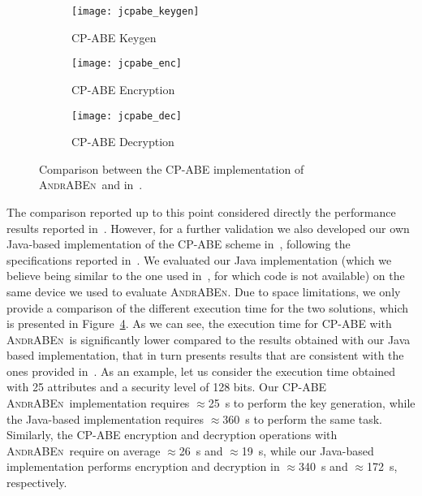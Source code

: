 \documentclass{sig-alternate-2013}
\newcommand{\andraben}{\textsc{AndrABEn}}
\begin{document}
\begin{figure}[h!]
	\centering
	\begin{subfigure}[b]{0.49\columnwidth}
		\centering
		\texttt{[image: jcpabe\_keygen]}
		\caption{CP-ABE Keygen}
		\label{cpabe_keygen_android_battery}
	\end{subfigure}
	\begin{subfigure}[b]{0.49\columnwidth}
		\centering
		\texttt{[image: jcpabe\_enc]}
		\caption{CP-ABE Encryption}
		\label{cpabe_enc_android}
	\end{subfigure}
\begin{subfigure}[b]{0.49\columnwidth}
		\centering
		\texttt{[image: jcpabe\_dec]}
		\caption{CP-ABE Decryption}
		\label{cpabe_dec_android}
	\end{subfigure}
	\caption{Comparison between the CP-ABE implementation of \andraben~and in~\cite{ABE_icc_2014}.}
	\label{fig:comparison}
\end{figure}





The comparison reported up to this point considered directly the performance results reported in~\cite{ABE_icc_2014}.
 However, for a further validation we also developed our own Java-based implementation of the CP-ABE scheme in~\cite{bethencourt2007ciphertext}, following the specifications reported in~\cite{ABE_icc_2014}. We evaluated our Java implementation (which we believe being similar to the one used in~\cite{ABE_icc_2014}, for which code is not available) on the same device we used to evaluate \andraben. 
Due to space limitations, we only provide a comparison of the different execution time for the two solutions, which is presented in Figure~\ref{fig:comparison}. As we can see, the execution time for CP-ABE with \andraben~is significantly lower compared to the results obtained with our Java based implementation, that in turn presents results that are consistent with the ones provided in~\cite{ABE_icc_2014}. As an example, let us consider the execution time obtained with 25 attributes and a security level of 128 bits. Our CP-ABE \andraben~implementation requires $\approx$25~s to perform the key generation, while the Java-based implementation requires $\approx$360~s to perform the same task. Similarly, the CP-ABE encryption and decryption operations with \andraben~require on average $\approx$26~s and $\approx$19~s, while our Java-based implementation performs encryption and decryption in $\approx$340~s and $\approx$172~s, respectively. 
\end{document}
